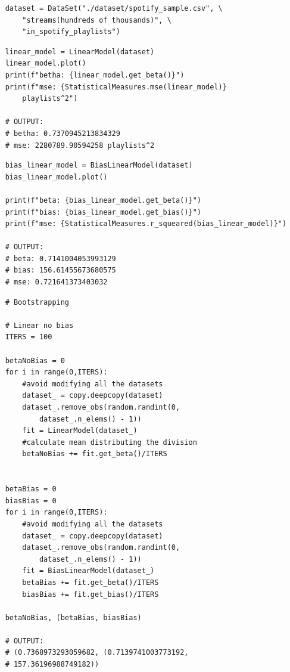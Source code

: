 \documentclass{report}
\begin{document}
    \subtitle{Carga del dataset}
    \begin{lstlisting}
    dataset = DataSet("./dataset/spotify_sample.csv", \
        "streams(hundreds of thousands)", \
        "in_spotify_playlists")
    \end{lstlisting}

    \subtitle{Grafica los datos superponiendo la l\'inea en los datos que pasa por el origen. ¿Cual es el MSE?}
    \begin{lstlisting}
    linear_model = LinearModel(dataset)
    linear_model.plot()
    print(f"betha: {linear_model.get_beta()}")
    print(f"mse: {StatisticalMeasures.mse(linear_model)}
        playlists^2")

    # OUTPUT:
    # betha: 0.7370945213834329
    # mse: 2280789.90594258 playlists^2
    \end{lstlisting}

    \subtitle{Grafica los datos superponiendo la l\'inea en los datos que no pasa por el origen. ¿Cual es el MSE?}
    \begin{lstlisting}
    bias_linear_model = BiasLinearModel(dataset)
    bias_linear_model.plot()

    print(f"beta: {bias_linear_model.get_beta()}")
    print(f"bias: {bias_linear_model.get_bias()}")
    print(f"mse: {StatisticalMeasures.r_squeared(bias_linear_model)}")

    # OUTPUT:
    # beta: 0.7141004053993129
    # bias: 156.61455673680575
    # mse: 0.721641373403032
    \end{lstlisting}

    \subtitle{Bootstrapping para el modelo lineal con y sin bias}
    \begin{lstlisting}
    # Bootstrapping

    # Linear no bias
    ITERS = 100

    betaNoBias = 0
    for i in range(0,ITERS):
        #avoid modifying all the datasets
        dataset_ = copy.deepcopy(dataset)
        dataset_.remove_obs(random.randint(0,
            dataset_.n_elems() - 1))
        fit = LinearModel(dataset_)
        #calculate mean distributing the division
        betaNoBias += fit.get_beta()/ITERS


    betaBias = 0
    biasBias = 0
    for i in range(0,ITERS):
        #avoid modifying all the datasets
        dataset_ = copy.deepcopy(dataset)
        dataset_.remove_obs(random.randint(0,
            dataset_.n_elems() - 1))
        fit = BiasLinearModel(dataset_)
        betaBias += fit.get_beta()/ITERS
        biasBias += fit.get_bias()/ITERS

    betaNoBias, (betaBias, biasBias)

    # OUTPUT:
    # (0.7368973293059682, (0.7139741003773192,
    # 157.36196988749182))
    \end{lstlisting}
\end{document}
